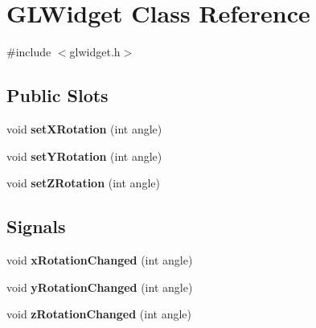 \hypertarget{class_g_l_widget}{
\section{GLWidget Class Reference}
\label{class_g_l_widget}
}


{\ttfamily \#include $<$glwidget.h$>$}

\subsection*{Public Slots}
\begin{DoxyCompactItemize}
\item 
\hypertarget{class_g_l_widget_a7083404e9ab8feffb2c486f7c15308ce}{
void {\bfseries setXRotation} (int angle)}
\label{class_g_l_widget_a7083404e9ab8feffb2c486f7c15308ce}

\item 
\hypertarget{class_g_l_widget_a29012eba3cb4201f78807066f2c9dcd4}{
void {\bfseries setYRotation} (int angle)}
\label{class_g_l_widget_a29012eba3cb4201f78807066f2c9dcd4}

\item 
\hypertarget{class_g_l_widget_a6f6b4fbbcc566d999db7e53aadeba889}{
void {\bfseries setZRotation} (int angle)}
\label{class_g_l_widget_a6f6b4fbbcc566d999db7e53aadeba889}

\end{DoxyCompactItemize}
\subsection*{Signals}
\begin{DoxyCompactItemize}
\item 
\hypertarget{class_g_l_widget_a3a557b9cd96f7b89661ceaa567c91640}{
void {\bfseries xRotationChanged} (int angle)}
\label{class_g_l_widget_a3a557b9cd96f7b89661ceaa567c91640}

\item 
\hypertarget{class_g_l_widget_ad47d672d0124b995e82551a95b59badb}{
void {\bfseries yRotationChanged} (int angle)}
\label{class_g_l_widget_ad47d672d0124b995e82551a95b59badb}

\item 
\hypertarget{class_g_l_widget_ab2035753b19b46105020d6045ac75a79}{
void {\bfseries zRotationChanged} (int angle)}
\label{class_g_l_widget_ab2035753b19b46105020d6045ac75a79}

\end{DoxyCompactItemize}
